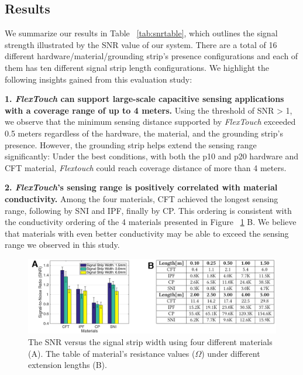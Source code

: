 \subsection{Results}

We summarize our results in Table ~\ref{tab:snrtable}, which outlines the signal strength illustrated by the SNR value of our system. There are a total of 16 different hardware/material/grounding strip's presence configurations and each of them has ten different signal strip length configurations. We highlight the following insights gained from this evaluation study:

\textbf{1. \textit{FlexTouch} can support large-scale capacitive sensing applications with a coverage range of up to 4 meters.}  Using the  threshold of SNR > 1, we observe that the minimum sensing distance supported by \textit{FlexTouch} exceeded 0.5 meters regardless of the hardware, the material, and the grounding strip's presence. However, the grounding strip helps extend the sensing range significantly: Under the best conditions, with both the p10 and p20 hardware and CFT material, \textit{Flextouch} could reach coverage distance of more than 4 meters.

\textbf{2. \textit{FlexTouch}'s sensing range is positively correlated with material conductivity.} Among the four materials, CFT achieved the longest sensing range, following by SNI and IPF, finally by CP. This ordering is consistent with the conductivity ordering of the 4 materials presented in Figure ~\ref{fig:material-width} B. We believe that materials with even better conductivity may be able to exceed the sensing range we observed in this study. 

\begin{figure}[ht]  
\centering
  \includegraphics[width=0.95\columnwidth]{figures/material-width-and-table.png}

  \setlength{\belowcaptionskip}{-8pt}
  \caption{The SNR versus the signal strip width using four different materials (A). The table of material's resistance values ($\Omega$) under different extension lengths (B).}
  \label{fig:material-width}
\end{figure}

